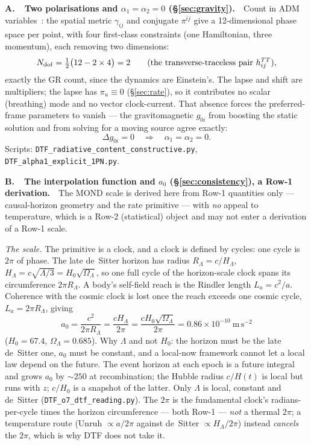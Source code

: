 \documentclass[11pt]{article}
\begin{document}
\noindent\textbf{A.\ \ Two polarisations and $\alpha_1=\alpha_2=0$ (\S\ref{sec:gravity}).}\ \
Count in ADM variables~\cite{ADM1962}: the spatial metric $\gamma_{ij}$ and conjugate $\pi^{ij}$ give a
12-dimensional phase space per point, with four first-class constraints (one Hamiltonian, three momentum), each
removing two dimensions:
\[ N_{\rm dof}=\tfrac12\big(12-2\times4\big)=2 \qquad (\text{the transverse-traceless pair } h_{ij}^{TT}), \]
exactly the GR count, since the dynamics are Einstein's. The lapse and shift are multipliers; the lapse has
$\pi_u\equiv0$ (\S\ref{sec:rate}), so it contributes no scalar (breathing) mode and no vector clock-current. That absence
forces the preferred-frame parameters to vanish --- the gravitomagnetic $g_{0i}$ from boosting the static
solution and from solving for a moving source agree exactly:
\[ \Delta g_{0i}=0 \quad\Rightarrow\quad \alpha_1=\alpha_2=0 . \]
Scripts: \texttt{DTF\_radiative\_content\_constructive.py}, \texttt{DTF\_alpha1\_explicit\_1PN.py}.

\medskip
\noindent\textbf{B.\ \ The interpolation function and $a_0$ (\S\ref{sec:consistency}), a Row-1 derivation.}\ \
The MOND scale is derived here from Row-1 quantities only --- causal-horizon geometry and the rate primitive
--- with \emph{no} appeal to temperature, which is a Row-2 (statistical) object and may not enter a derivation
of a Row-1 scale.

\emph{The scale.} The primitive is a clock, and a clock is defined by cycles: one cycle is $2\pi$ of phase. The
late de~Sitter horizon has radius $R_\Lambda=c/H_\Lambda$, $H_\Lambda=c\sqrt{\Lambda/3}=H_0\sqrt{\Omega_\Lambda}$, so one full cycle of
the horizon-scale clock spans its circumference $2\pi R_\Lambda$. A body's self-field reach is the Rindler length
$L_a=c^2/a$. Coherence with the cosmic clock is lost once the reach exceeds one cosmic cycle, $L_a=2\pi R_\Lambda$, giving
\[
a_0=\frac{c^2}{2\pi R_\Lambda}=\frac{cH_\Lambda}{2\pi}=\frac{cH_0\sqrt{\Omega_\Lambda}}{2\pi}=0.86\times10^{-10}\ \mathrm{m\,s^{-2}}
\]
($H_0=67.4$, $\Omega_\Lambda=0.685$). Why $\Lambda$ and not $H_0$: the horizon must be the late de~Sitter one, $a_0$ must be
constant, and a local-now framework cannot let a local law depend on the future. The event horizon at each epoch
is a future integral and grows $a_0$ by $\sim\!250$ at recombination; the Hubble radius $c/H(t)$ is local but runs
with $z$; $c/H_0$ is a snapshot of the latter. Only $\Lambda$ is local, constant and de~Sitter
(\texttt{DTF\_o7\_dtf\_reading.py}). The $2\pi$ is the fundamental clock's radians-per-cycle times the horizon
circumference --- both Row-1 --- \emph{not} a thermal $2\pi$; a temperature route (Unruh $\propto a/2\pi$ against
de~Sitter $\propto H_\Lambda/2\pi$) instead \emph{cancels} the $2\pi$, which is why DTF does not take it.
\end{document}

